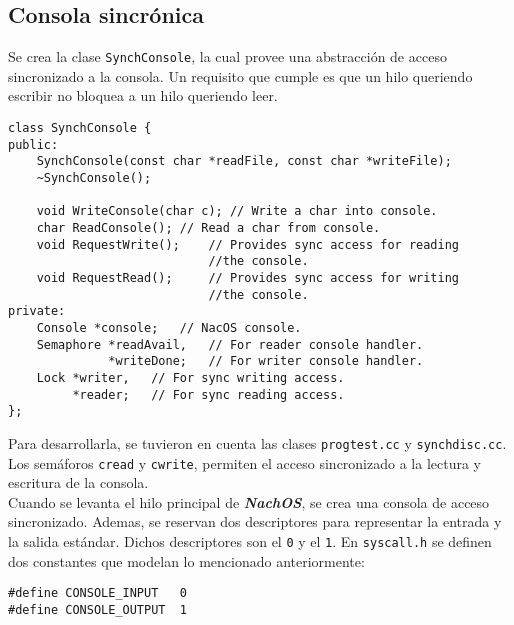 \subsection*{Consola sincrónica}
Se crea la clase \texttt{SynchConsole}, la cual provee una abstracción de acceso sincronizado a la consola. Un requisito que cumple es que un hilo queriendo escribir no bloquea a un hilo queriendo leer.
\begin{lstlisting}[style=C]
class SynchConsole {
public:
	SynchConsole(const char *readFile, const char *writeFile);
	~SynchConsole();
	
    void WriteConsole(char c); // Write a char into console.
    char ReadConsole(); // Read a char from console.
    void RequestWrite();    // Provides sync access for reading
                            //the console.
    void RequestRead();     // Provides sync access for writing
                            //the console.
private: 
    Console *console;   // NacOS console.
    Semaphore *readAvail,   // For reader console handler.
              *writeDone;   // For writer console handler.
    Lock *writer,   // For sync writing access.
         *reader;   // For sync reading access.
};
\end{lstlisting}
Para desarrollarla, se tuvieron en cuenta las clases \texttt{progtest.cc} y \texttt{synchdisc.cc}.\\
Los semáforos \texttt{cread} y \texttt{cwrite}, permiten el acceso sincronizado a la lectura y escritura de la consola.\\
Cuando se levanta el hilo principal de \textbf{\textit{NachOS}}, se crea una consola de acceso sincronizado. Ademas, se reservan dos descriptores para representar la entrada y la salida estándar. Dichos descriptores son el \texttt{0} y el \texttt{1}. En \texttt{syscall.h} se definen dos constantes que modelan lo mencionado anteriormente:
\begin{lstlisting}
#define CONSOLE_INPUT	0
#define CONSOLE_OUTPUT	1
\end{lstlisting}
